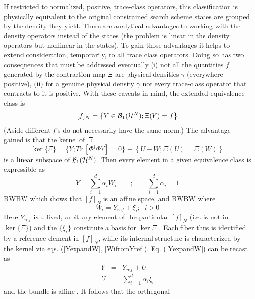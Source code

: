 If restricted to normalized, positive, trace-class operators, this
classification is physically equivalent to the original constrained search
scheme states are grouped by the density they yield. There are analytical
advantages to working with the density operators instead of the states (the
problem is linear in the density operators but nonlinear in the states). To
gain those advantages it helps to extend consideration, temporarily, to all
trace class operators. Doing so has two consequences that must be addressed
eventually (i) not all the quantities $f$ generated by the contraction map $%
\Xi $ are physical densities $\gamma $ (everywhere positive), (ii) for a
genuine physical density $\gamma $ not every trace-class operator that
contracts to it is positive. With these caveats in mind, the extended
equivalence class is 
\begin{equation}
\lbrack f]_{N}=\left\{ Y\in {\cal B}_{1}({\cal H}^{N});\Xi (Y)=f\right\}
\label{genequiv}
\end{equation}%
(Aside different $f$'s do not necessarily have the same norm.) The advantage
gained is that the kernel of $\Xi $ 
\begin{equation}
\ker \{\Xi \}=\{Y;Tr\,[\Phi ^{\dagger }\Phi Y]=0\}\equiv \left\{ U-W;\Xi
\left( U\right) =\Xi \left( W\right) \right\}  \label{kerdef}
\end{equation}%
is a linear subspace of ${\cal B}_{1}({\cal H}^{N})$. Then every element in
a given equivalence class is expressible as 
\begin{equation}
Y=\sum_{i=1}^{d}\alpha _{i}W_{i}\qquad ;\qquad \sum_{i=1}^{d}\alpha _{i}=1
\label{YexpandW}
\end{equation}%
BWBW which shows that $[f]_{N}$ is an affine space, and BWBW where 
\begin{equation}
W_{i}=Y_{ref}+\xi _{i};\;\;i>0  \label{WifromYref}
\end{equation}%
Here $Y_{ref}$ is a fixed, arbitrary element of the particular $[f]_{N}$
(i.e. is not in $\ker \{\Xi \}$) and the $\{\xi _{i}\}$ constitute a basis
for $\ker \Xi $ \cite{Yref}. Each fiber thus is identified by a reference
element in $[f]_{N}$, while its internal structure is characterized by the
kernel via eqs. (\ref{YexpandW}, \ref{WifromYref}). Eq. (\ref{YexpandW}) can
be recast as 
\begin{eqnarray}
Y &=&Y_{ref}+U  \nonumber \\
U &=&\sum_{i=1}^{d}\alpha _{i}\xi _{i}  \label{YYref}
\end{eqnarray}%
and the bundle is affine \cite{diffbundle}. It follows that the orthogonal
